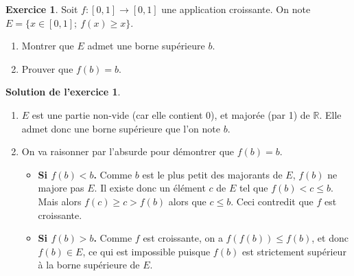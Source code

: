 \documentclass[a4paper, 11pt,openany]{article}%
\theoremstyle{plain}
\theoremstyle{definition}
\newtheorem{exo}{Exercice}
\newtheorem{sol}{Solution de l'exercice}
\theoremstyle{remark}
\newcommand{\R}{\mathbb{R}}
\begin{document}
\begin{exo}
Soit $f:[0,1] \to [0,1]$ une application croissante. On note $E=\{x \in [0,1]; \ f(x)\geqslant x\}$.
\begin{enumerate}
\item Montrer que $E$ admet une borne supérieure $b$.
\item Prouver que $f(b)=b$.
\end{enumerate}
\end{exo}

\begin{sol}
\begin{enumerate}
\item $E$ est une partie non-vide (car elle contient 0), et majorée (par 1) de $\R$. Elle admet donc une borne supérieure que l'on note $b$. 
\item On va raisonner par l'absurde pour démontrer que $f(b)=b$.
\begin{itemize}
\item \textbf{Si $f(b)<b$.} Comme $b$ est le plus petit des majorants de $E$, $f(b)$ ne majore pas $E$. Il existe donc un élément $c$ de $E$ tel que $f(b) < c \leqslant b$. Mais alors $f(c)\geqslant c > f(b)$ alors que $c \leqslant b$. Ceci contredit que $f$ est croissante.
\item \textbf{Si $f(b)>b$.} Comme $f$ est croissante, on a $f(f(b)) \leqslant f(b)$, et donc $f(b) \in E$, ce qui est impossible puisque $f(b)$ est strictement supérieur à la borne supérieure de $E$.
\end{itemize}
\end{enumerate}
\end{sol}
\end{document}
